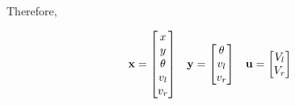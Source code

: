 Therefore,

\begin{theorem}
  \label{thm:linearized_diff_drive_model}
  \begin{equation*}
    \begin{array}{ccc}
      \mathbf{x} =
      \begin{bmatrix}
        x \\
        y \\
        \theta \\
        v_l \\
        v_r
      \end{bmatrix} &
      \mathbf{y} =
      \begin{bmatrix}
        \theta \\
        v_l \\
        v_r
      \end{bmatrix} &
      \mathbf{u} =
      \begin{bmatrix}
        V_l \\
        V_r
      \end{bmatrix}
    \end{array}
  \end{equation*}


\end{theorem}
